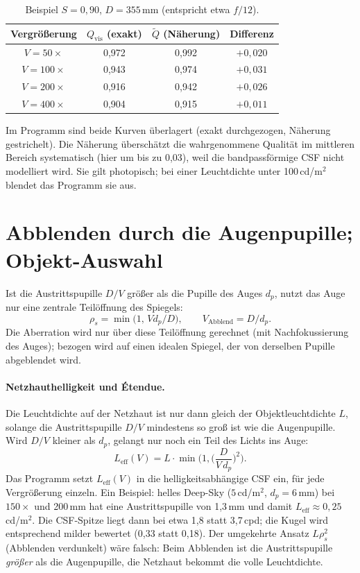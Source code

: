 \documentclass[11pt,a4paper]{article}
\newcommand{\Qvis}{Q_{\mathrm{vis}}}
\begin{document}
\begin{table}[ht]
\centering
\begin{tabular}{cccc}
\toprule
Vergrößerung & $\Qvis$ (exakt) & $\tilde Q$ (Näherung) & Differenz\\
\midrule
$V=50\times$ & 0,972 & 0,992 & $+0{,}020$\\
$V=100\times$ & 0,943 & 0,974 & $+0{,}031$\\
$V=200\times$ & 0,916 & 0,942 & $+0{,}026$\\
$V=400\times$ & 0,904 & 0,915 & $+0{,}011$\\
\bottomrule
\end{tabular}
\caption{Beispiel $S=0{,}90$, $D=355$\,mm (entspricht etwa $f/12$).}
\end{table}
Im Programm sind beide Kurven überlagert (exakt durchgezogen, Näherung gestrichelt). Die Näherung überschätzt die wahrgenommene Qualität im mittleren Bereich systematisch (hier um bis zu 0,03), weil die bandpassförmige CSF nicht modelliert wird. Sie gilt photopisch; bei einer Leuchtdichte unter 100\,cd/m$^2$ blendet das Programm sie aus.

\section{Abblenden durch die Augenpupille; Objekt-Auswahl}
Ist die Austrittspupille $D/V$ größer als die Pupille des Auges $d_p$, nutzt das Auge nur eine zentrale Teilöffnung des Spiegels:
\begin{equation}
\rho_s=\min\!\big(1,\,V d_p/D\big),\qquad V_{\mathrm{Abblend}}=D/d_p .
\end{equation}
Die Aberration wird nur über diese Teilöffnung gerechnet (mit Nachfokussierung des Auges); bezogen wird auf einen idealen Spiegel, der von derselben Pupille abgeblendet wird.

\paragraph{Netzhauthelligkeit und Étendue.} Die Leuchtdichte auf der Netzhaut ist nur dann gleich der Objektleuchtdichte $L$, solange die Austrittspupille $D/V$ mindestens so groß ist wie die Augenpupille. Wird $D/V$ kleiner als $d_p$, gelangt nur noch ein Teil des Lichts ins Auge:
\begin{equation}
L_{\mathrm{eff}}(V)=L\cdot\min\!\Big(1,\Big(\frac{D}{V\,d_p}\Big)^{2}\Big).
\end{equation}
Das Programm setzt $L_{\mathrm{eff}}(V)$ in die helligkeitsabhängige CSF ein, für jede Vergrößerung einzeln. Ein Beispiel: helles Deep-Sky ($5$\,cd/m$^2$, $d_p=6$\,mm) bei $150\times$ und 200\,mm hat eine Austrittspupille von 1,3\,mm und damit $L_{\mathrm{eff}}\approx0{,}25$\,cd/m$^2$. Die CSF-Spitze liegt dann bei etwa 1,8 statt 3,7\,cpd; die Kugel wird entsprechend milder bewertet (0,33 statt 0,18). Der umgekehrte Ansatz $L\rho_s^2$ (Abblenden verdunkelt) wäre falsch: Beim Abblenden ist die Austrittspupille \emph{größer} als die Augenpupille, die Netzhaut bekommt die volle Leuchtdichte.
\end{document}
